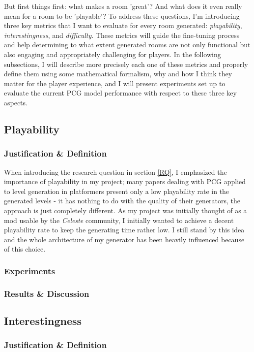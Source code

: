 \documentclass{article}
\newcommand{\Celeste}{\textit{Celeste} }
\begin{document}
But first things first: what makes a room 'great'? And what does it even really mean for a room to be 'playable'? To address these questions, I’m introducing three key metrics that I want to evaluate for every room generated: \textit{playability}, \textit{interestingness}, and \textit{difficulty}. These metrics will guide the fine-tuning process and help determining to what extent generated rooms are not only functional but also engaging and appropriately challenging for players. In the following subsections, I will describe more precisely each one of these metrics and properly define them using some mathematical formalism, why and how I think they matter for the player experience, and I will present experiments set up to evaluate the current PCG model performance with respect to these three key aspects.

\subsection{Playability}
\subsubsection{Justification \& Definition}
When introducing the research question in section \ref{RQ}, I emphasized the importance of playability in my project; many papers dealing with PCG applied to level generation in platformers present only a low playability rate in the generated levels - it has nothing to do with the quality of their generators, the approach is just completely different. As my project was initially thought of as a mod usable by the \Celeste community, I initially wanted to achieve a decent playability rate to keep the generating time rather low. I still stand by this idea and the whole architecture of my generator has been heavily influenced because of this choice.

\subsubsection{Experiments}

\subsubsection{Results \& Discussion}


\subsection{Interestingness}
\subsubsection{Justification \& Definition}
\end{document}
